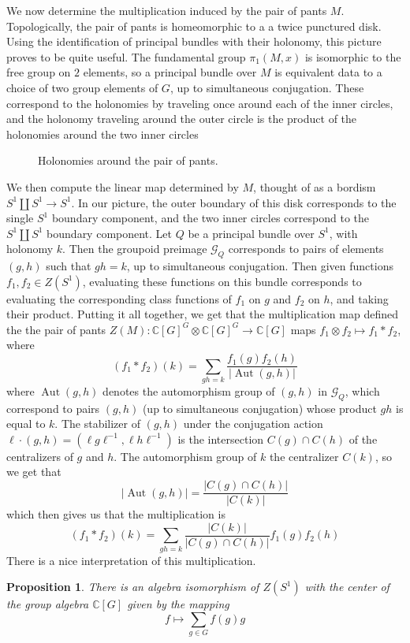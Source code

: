 \documentclass[psamsfonts, 11pt]{amsart}
\newcommand{\incfig}[2]{%
    \fontsize{48pt}{50pt}\selectfont
    \def\svgwidth{\columnwidth}
    \scalebox{#2}{}
}
\newtheorem{prop}[thm]{Proposition}
\theoremstyle{definition}
\theoremstyle{remark}
\newcommand{\C}{\mathbb{C}}
\newcommand{\inv}{^{-1}}
\DeclareMathOperator{\Aut}{Aut}
\begin{document}
We now determine the multiplication induced by the pair of pants $M$. Topologically,
the pair of pants is homeomorphic to a a twice punctured disk. Using the identification
of principal bundles with their holonomy, this picture proves to be quite useful.
The fundamental group $\pi_1(M,x)$ is isomorphic to the free group on $2$ elements,
so a principal bundle over $M$ is equivalent data to a choice of two group elements
of $G$, up to simultaneous conjugation. These correspond to the holonomies by traveling
once around each of the inner circles, and the holonomy traveling around the outer
circle is the product of the holonomies around the two inner circles
%
\begin{figure}[ht]
    \centering
    \incfig{pants_holonomy}{.20}
    \caption{Holonomies around the pair of pants.}
\end{figure}
%
We then compute the linear map determined by $M$, thought of as a bordism
$S^1 \coprod S^1 \to S^1$. In our picture, the outer boundary of this disk corresponds
to the single $S^1$ boundary component, and the two inner circles correspond to the
$S^1 \coprod S^1$ boundary component. Let $Q$ be a principal bundle over $S^1$,
with holonomy $k$. Then the groupoid preimage $\mathcal{G}_Q$ corresponds to
pairs of elements $(g,h)$ such that $gh = k$, up to simultaneous conjugation.
Then given functions $f_1,f_2 \in Z(S^1)$, evaluating these functions on this bundle
corresponds to evaluating the corresponding class functions of $f_1$ on $g$ and $f_2$ on
$h$, and taking their product. Putting it all together, we get that the multiplication
map defined the the pair of pants $Z(M) : \C[G]^G \otimes \C[G]^G \to \C[G]$ maps
$f_1 \otimes f_2 \mapsto f_1 * f_2$, where
\[
(f_1 * f_2)(k) = \sum_{gh = k} \frac{f_1(g)f_2(h)}{|\Aut(g,h)|}
\]
where $\Aut(g,h)$ denotes the automorphism group of $(g,h)$ in $\mathcal{G}_Q$, which
correspond to pairs $(g,h)$ (up to simultaneous conjugation) whose product $gh$ is
equal to $k$. The stabilizer of $(g,h)$ under the conjugation action
$\ell \cdot (g,h) = (\ell g\ell\inv, \ell h\ell\inv)$ is the intersection
$C(g) \cap C(h)$ of the centralizers of $g$ and $h$. The automorphism group of $k$
the centralizer $C(k)$, so we get that
\[
|\Aut(g,h)| = \frac{|C(g) \cap C(h)|}{|C(k)|}
\]
which then gives us that the multiplication is
\[
(f_1 * f_2)(k) = \sum_{gh = k} \frac{|C(k)|}{|C(g) \cap C(h)|}f_1(g)f_2(h)
\]
There is a nice interpretation of this multiplication.
%
\begin{prop}
There is an algebra isomorphism of $Z(S^1)$ with the center of the group algebra
$\C[G]$ given by the mapping
\[
f \mapsto \sum_{g \in G} f(g)g
\]
\end{prop}
\end{document}
